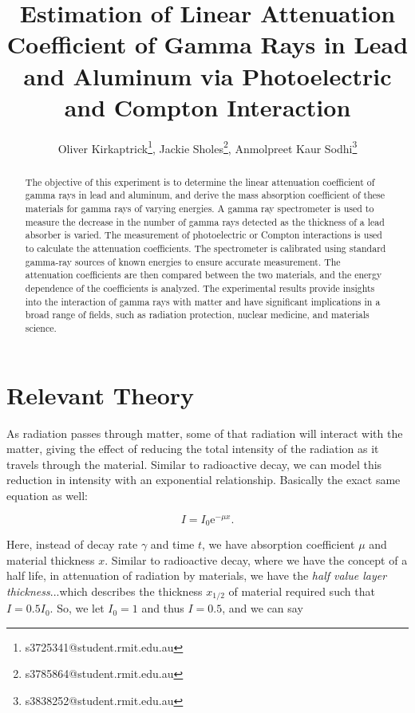 \documentclass[a4paper]{article}
\title{Estimation of Linear Attenuation Coefficient of Gamma Rays in Lead and Aluminum via Photoelectric and Compton Interaction}
\author{
    Oliver Kirkaptrick\footnote{s3725341@student.rmit.edu.au},
    Jackie Sholes\footnote{s3785864@student.rmit.edu.au},
    Anmolpreet Kaur Sodhi\footnote{s3838252@student.rmit.edu.au}
}
\begin{document}
\maketitle

\begin{abstract}
    The objective of this experiment is to determine the linear attenuation coefficient of gamma rays in lead and aluminum, and derive the mass absorption coefficient of these materials for gamma rays of varying energies. A gamma ray spectrometer is used to measure the decrease in the number of gamma rays detected as the thickness of a lead absorber is varied. The measurement of photoelectric or Compton interactions is used to calculate the attenuation coefficients. The spectrometer is calibrated using standard gamma-ray sources of known energies to ensure accurate measurement. The attenuation coefficients are then compared between the two materials, and the energy dependence of the coefficients is analyzed. The experimental results provide insights into the interaction of gamma rays with matter and have significant implications in a broad range of fields, such as radiation protection, nuclear medicine, and materials science.
\end{abstract}

\section{Relevant Theory}

As radiation passes through matter, some of that radiation will interact with the matter, giving the effect of reducing the total intensity of the radiation as it travels through the material. Similar to radioactive decay, we can model this reduction in intensity with an exponential relationship. Basically the exact same equation as well:

\begin{equation}
    I=I_{0}\mathrm{e}^{-\mu x}.
\end{equation}

Here, instead of decay rate $\gamma$ and time $t$, we have absorption coefficient $\mu$ and material thickness $x$. Similar to radioactive decay, where we have the concept of a half life, in attenuation of radiation by materials, we have the \textit{half value layer thickness}...which describes the thickness $x_{1/2}$ of material required such that $I=0.5I_{0}$. So, we let $I_{0}=1$ and thus $I=0.5$, and we can say
\end{document}
